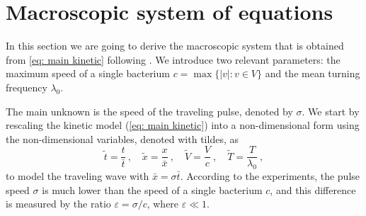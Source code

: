 \documentclass[11pt,twoside]{article}
\numberwithin{equation}{section}
\theoremstyle{plain}
\theoremstyle{nonumberplain}
\begin{document}
\section{Macroscopic system of equations}\label{sec: maro system}
In this section we are going to derive the macroscopic system that is obtained from \eqref{eq: main kinetic} following \cite{saragosti2010mathematical}. We introduce two relevant parameters: the maximum speed of a single bacterium $c = \max\{|v|: v \in V\}$ and the mean turning frequency $\lambda_0$.

The main unknown is the speed of the traveling pulse, denoted by $\sigma$. We start by rescaling the kinetic model (\ref{eq: main kinetic}) into a non-dimensional form using the non-dimensional variables, denoted with tildes, as
\begin{equation}
    \tilde{t}= \frac{{t}}{\bar{t}}\ , \quad \tilde{x} = \frac{x}{\bar{x}}\ , \quad {\tilde{V} = \frac{V}{c}}\ , \quad \tilde{T}=\frac{T}{\lambda_0}\ ,
    \nonumber
\end{equation}
to model the traveling wave with $\bar{x} = \sigma\bar{t}$. According to the experiments, the pulse
speed $\sigma$ is much lower than the speed of a single bacterium $c$, and this difference is measured by the ratio $\varepsilon = \sigma / c$, where $\varepsilon \ll 1$.
\end{document}
